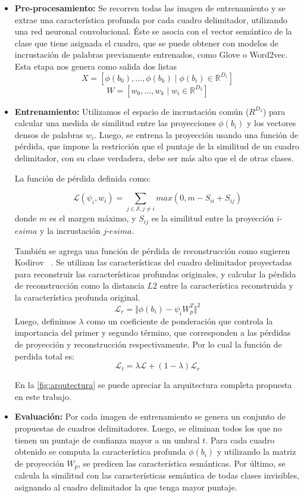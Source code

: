 \begin{itemize}
	\item \textbf{Pre-procesamiento:} Se recorren todas las imagen de entrenamiento y se extrae una característica profunda por cada cuadro delimitador, utilizando una red neuronal convolucional. Éste se asocia con el vector semántico de la clase que tiene asignada el cuadro, que se puede obtener con modelos de incrustación de palabras previamente entrenados, como Glove o Word2vec. Esta etapa nos genera como salida dos listas 
	\[X = [\phi(b_0),...,\phi(b_k) \mid \phi(b_i) \in \mathbb{R}^{D_1}]\] 
	\[W = [w_0,...,w_k \mid w_i \in \mathbb{R}^{D_2}]\]
	
	\item \textbf{Entrenamiento:} Utilizamos el espacio de incrustación común (${R}^{D_2}$) para calcular una medida de similitud entre las proyecciones  $\phi(b_i)$ y los vectores densos de palabras $w_i$. Luego, se entrena la proyección usando una función de pérdida, que impone la restricción que el puntaje de la similitud de un cuadro delimitador, con su clase verdadera, debe ser más alto que el de otras clases. 

	La función de pérdida definida como: 
	
	\[\mathcal{L}(\psi_i, w_i) = \sum_{j \in \mathcal{S}, j\neq i} max(0, m - S_{ii} + S_{ij})\] 
	donde $m$ es el margen máximo, y $S_{ij}$ es la similitud entre la proyección $i$-$esima$ y la incrustación $j$-$esima$.
 
	También se agrega una función de pérdida de reconstrucción como sugieren Kodirov \etal~\cite{kodirov2017semantic}. Se utilizan las características del cuadro delimitador proyectadas para reconstruir las características profundas originales, y calcular la pérdida de reconstrucción como la distancia $L2$  entre la característica reconstruida y la característica profunda original.
	\[\mathcal{L}_r = \Vert{\phi(b_i) - \psi_iW_p^T}\Vert^2 \] 
	Luego, definimos $\lambda$ como un coeficiente de ponderación que controla la importancia del primer y segundo término, que corresponden a las pérdidas de proyección y reconstrucción respectivamente. Por lo cual la función de perdida total es: 
	\[\mathcal{L}_t = \lambda \mathcal{L} + (1-\lambda) \mathcal{L}_r \]
 	 
 	En la \autoref{fig:arqutectura} se puede apreciar la arquitectura completa propuesta en este trabajo.
 	 
 	\item \textbf{Evaluación:} Por cada imagen de entrenamiento se genera un conjunto de propuestas de cuadros delimitadores. Luego, se eliminan todos los que no tienen un puntaje de confianza mayor a un umbral $t$. Para cada cuadro obtenido se computa la característica profunda $\phi(b_i)$ y utilizando la matriz de proyección $W_p$, se predicen las característica semánticas. Por último, se calcula la similitud con las características semántica de todas clases invisibles, asignando al cuadro delimitador la que tenga mayor puntaje.
\end{itemize}

